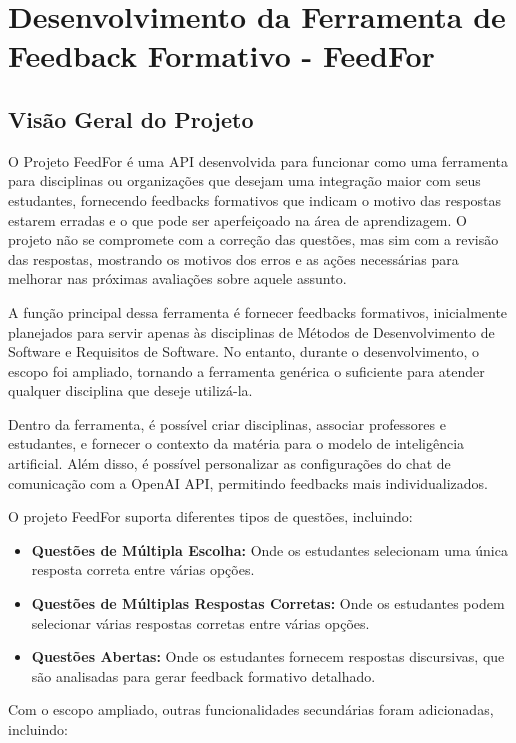 \chapter{Desenvolvimento da Ferramenta de Feedback Formativo - FeedFor}

\section{Visão Geral do Projeto}

O Projeto FeedFor é uma API desenvolvida para funcionar como uma ferramenta para disciplinas ou organizações que desejam uma integração maior com seus estudantes, fornecendo feedbacks formativos que indicam o motivo das respostas estarem erradas e o que pode ser aperfeiçoado na área de aprendizagem. O projeto não se compromete com a correção das questões, mas sim com a revisão das respostas, mostrando os motivos dos erros e as ações necessárias para melhorar nas próximas avaliações sobre aquele assunto.

A função principal dessa ferramenta é fornecer feedbacks formativos, inicialmente planejados para servir apenas às disciplinas de Métodos de Desenvolvimento de Software e Requisitos de Software. No entanto, durante o desenvolvimento, o escopo foi ampliado, tornando a ferramenta genérica o suficiente para atender qualquer disciplina que deseje utilizá-la.

Dentro da ferramenta, é possível criar disciplinas, associar professores e estudantes, e fornecer o contexto da matéria para o modelo de inteligência artificial. Além disso, é possível personalizar as configurações do chat de comunicação com a OpenAI API, permitindo feedbacks mais individualizados.

O projeto FeedFor suporta diferentes tipos de questões, incluindo:

\begin{itemize}
    \item \textbf{Questões de Múltipla Escolha:} Onde os estudantes selecionam uma única resposta correta entre várias opções.
    \item \textbf{Questões de Múltiplas Respostas Corretas:} Onde os estudantes podem selecionar várias respostas corretas entre várias opções.
    \item \textbf{Questões Abertas:} Onde os estudantes fornecem respostas discursivas, que são analisadas para gerar feedback formativo detalhado.
\end{itemize}

Com o escopo ampliado, outras funcionalidades secundárias foram adicionadas, incluindo:

